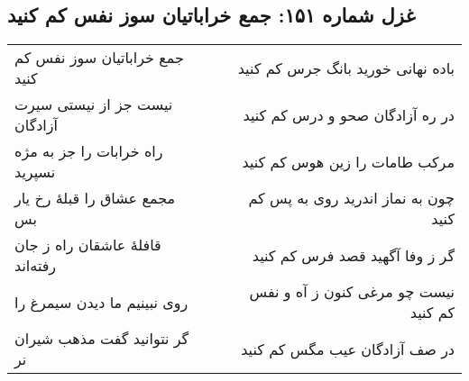 \begin{center}
\section*{غزل شماره ۱۵۱: جمع خراباتیان سوز نفس کم کنید}
\label{sec:151}
\begin{longtable}{l p{0.5cm} r}
جمع خراباتیان سوز نفس کم کنید
&&
باده نهانی خورید بانگ جرس کم کنید
\\
نیست جز از نیستی سیرت آزادگان
&&
در ره آزادگان صحو و درس کم کنید
\\
راه خرابات را جز به مژه نسپرید
&&
مرکب طامات را زین هوس کم کنید
\\
مجمع عشاق را قبلهٔ رخ یار بس
&&
چون به نماز اندرید روی به پس کم کنید
\\
قافلهٔ عاشقان راه ز جان رفته‌اند
&&
گر ز وفا آگهید قصد فرس کم کنید
\\
روی نبینیم ما دیدن سیمرغ را
&&
نیست چو مرغی کنون ز آه و نفس کم کنید
\\
گر نتوانید گفت مذهب شیران نر
&&
در صف آزادگان عیب مگس کم کنید
\\
\end{longtable}
\end{center}
